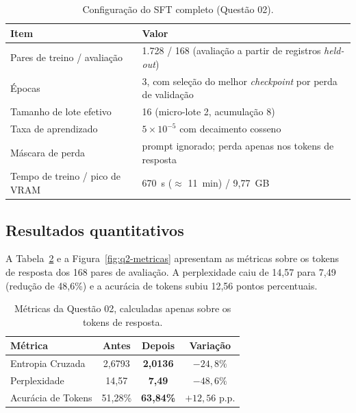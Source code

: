 \begin{table}[ht]
  \centering
  \caption{Configuração do SFT completo (Questão 02).}
  \label{tab:q2-hiper}
  \footnotesize
  \begin{tabularx}{0.92\textwidth}{@{}l X@{}}
    \toprule
    \textbf{Item} & \textbf{Valor} \\
    \midrule
    Pares de treino / avaliação & 1.728 / 168 (avaliação a partir de registros \textit{held-out}) \\
    Épocas & 3, com seleção do melhor \textit{checkpoint} por perda de validação \\
    Tamanho de lote efetivo & 16 (micro-lote 2, acumulação 8) \\
    Taxa de aprendizado & $5 \times 10^{-5}$ com decaimento cosseno \\
    Máscara de perda & prompt ignorado; perda apenas nos tokens de resposta \\
    Tempo de treino / pico de VRAM & 670~s ($\approx$ 11~min) / 9,77~GB \\
    \bottomrule
  \end{tabularx}
\end{table}

\subsection{Resultados quantitativos}

A Tabela~\ref{tab:q2-metricas} e a Figura~\ref{fig:q2-metricas} apresentam as
métricas sobre os tokens de resposta dos 168 pares de avaliação. A perplexidade caiu
de 14,57 para 7,49 (redução de 48,6\%) e a acurácia de tokens subiu 12,56 pontos
percentuais.

\begin{table}[ht]
  \centering
  \caption{Métricas da Questão 02, calculadas apenas sobre os tokens de resposta.}
  \label{tab:q2-metricas}
  \begin{tabular}{@{}l c c c@{}}
    \toprule
    \textbf{Métrica} & \textbf{Antes} & \textbf{Depois} & \textbf{Variação} \\
    \midrule
    Entropia Cruzada    & 2,6793 & \textbf{2,0136} & $-24,8\%$ \\
    Perplexidade        & 14,57  & \textbf{7,49}   & $-48,6\%$ \\
    Acurácia de Tokens  & 51,28\% & \textbf{63,84\%} & $+12,56$ p.p. \\
    \bottomrule
  \end{tabular}
\end{table}


